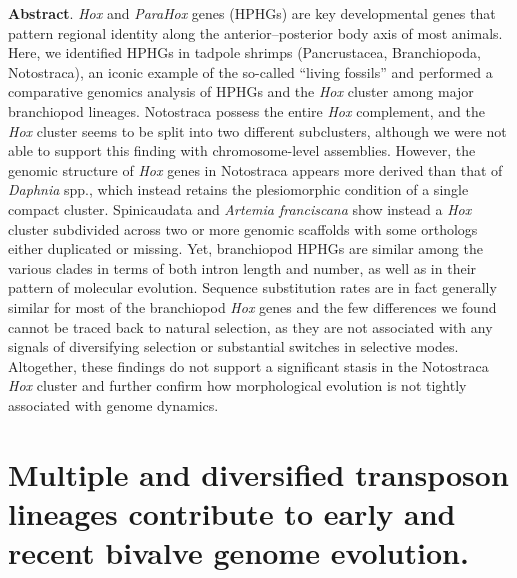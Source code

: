 \textbf{Abstract}. \textit{Hox} and \textit{ParaHox} genes (HPHGs) are key developmental genes that pattern regional identity along the anterior–posterior body axis of most animals. Here, we identified HPHGs in tadpole shrimps (Pancrustacea, Branchiopoda, Notostraca), an iconic example of the so-called “living fossils” and performed a comparative genomics analysis of HPHGs and the \textit{Hox} cluster among major branchiopod lineages. Notostraca possess the entire \textit{Hox} complement, and the \textit{Hox} cluster seems to be split into two different subclusters, although we were not able to support this finding with chromosome-level assemblies. However, the genomic structure of \textit{Hox} genes in Notostraca appears more derived than that of \textit{Daphnia} spp., which instead retains the plesiomorphic condition of a single compact cluster. Spinicaudata and \textit{Artemia franciscana} show instead a \textit{Hox} cluster subdivided across two or more genomic scaffolds with some orthologs either duplicated or missing. Yet, branchiopod HPHGs are similar among the various clades in terms of both intron length and number, as well as in their pattern of molecular evolution. Sequence substitution rates are in fact generally similar for most of the branchiopod \textit{Hox} genes and the few differences we found cannot be traced back to natural selection, as they are not associated with any signals of diversifying selection or substantial switches in selective modes. Altogether, these findings do not support a significant stasis in the Notostraca \textit{Hox} cluster and further confirm how morphological evolution is not tightly associated with genome dynamics.

\clearpage


{
\section*{\LARGE{Multiple and diversified transposon lineages contribute to early and recent bivalve genome evolution.}}

\vspace{4mm}


\vspace{4mm}



\vspace{4mm}

}

